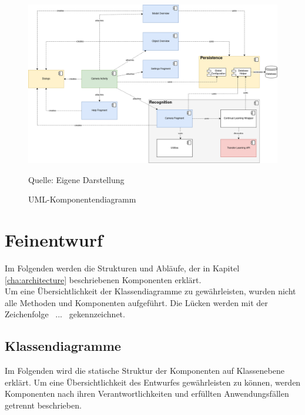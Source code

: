 \documentclass[oneside]{ausarbeitung}
\begin{document}
\begin{figure}[hptb]
	\centering
	\includegraphics[height=0.5\textheight]{images/building-block-view.png}
	\caption{UML-Komponentendiagramm} Quelle: Eigene Darstellung
	\label{fig:component-diagram}
\end{figure}

\section{Feinentwurf}
Im Folgenden werden die Strukturen und Abläufe, der in Kapitel \ref{cha:architecture} beschriebenen Komponenten erklärt.\\
Um eine Übersichtlichkeit der Klassendiagramme zu gewährleisten, wurden nicht alle Methoden und Komponenten aufgeführt. Die Lücken werden mit der Zeichenfolge \glqq\ ... \grqq\ gekennzeichnet.
\subsection{Klassendiagramme}
Im Folgenden wird die statische Struktur der Komponenten auf Klassenebene erklärt.
Um eine Übersichtlichkeit des Entwurfes gewährleisten zu können, werden Komponenten nach ihren Verantwortlichkeiten und erfüllten Anwendungsfällen getrennt beschrieben.
\end{document}

